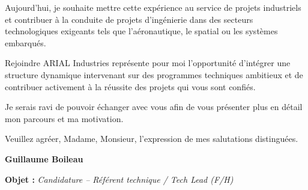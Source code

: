 \documentclass[11pt,a4paper]{../_shared/altacv}
\begin{document}
{Aujourd’hui, je souhaite mettre cette expérience au service de projets industriels et contribuer à la conduite de projets d’ingénierie dans des secteurs technologiques exigeants tels que l’aéronautique, le spatial ou les systèmes embarqués.

Rejoindre ARIAL Industries représente pour moi l’opportunité d’intégrer une structure dynamique intervenant sur des programmes techniques ambitieux et de contribuer activement à la réussite des projets qui vous sont confiés.

Je serais ravi de pouvoir échanger avec vous afin de vous présenter plus en détail mon parcours et ma motivation.

Veuillez agréer, Madame, Monsieur, l’expression de mes salutations distinguées.

\textbf{Guillaume Boileau}

}
\fi
\vspace{-0.5cm}
\vspace{-.5cm}
{\color{accent}\textbf{Objet :}} \textit{Candidature -- Référent technique / Tech Lead (F/H)}
\end{document}
